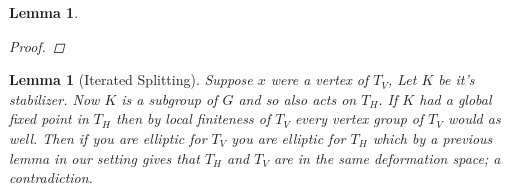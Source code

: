 \documentclass{article}
\theoremstyle{mystyle}
\newtheorem{lem}[thm]{Lemma}
\theoremstyle{remark}
\begin{document}
\begin{lem}
\begin{proof}
    

    \end{proof}
\end{lem}



\begin{lem}
    [Iterated Splitting]
    \label{lem:iteratedsplitting} 
    Suppose \(x\) were a vertex of \(T_{V}\), Let \(K\) be it's stabilizer. Now \(K\) is a subgroup of \(G\) and so also acts on \(T_H\). If \(K\) had a global fixed point in \(T_H\)  then by local finiteness of \(T_V\) every vertex group of \(T_V\) would as well. Then if you are elliptic for \(T_V\) you are elliptic for \(T_H\) which by a previous lemma in our setting gives that \(T_H\) and \(T_V\) are in the same deformation space; a contradiction.
\end{lem}
\end{document}
